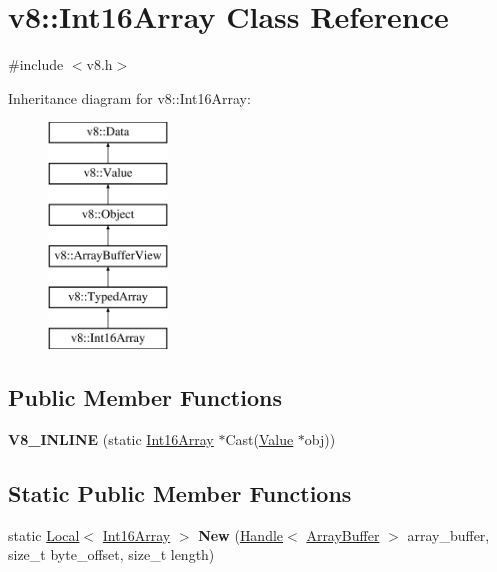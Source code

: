 \hypertarget{classv8_1_1_int16_array}{}\section{v8\+:\+:Int16\+Array Class Reference}
\label{classv8_1_1_int16_array}


{\ttfamily \#include $<$v8.\+h$>$}

Inheritance diagram for v8\+:\+:Int16\+Array\+:\begin{figure}[H]
\begin{center}
\leavevmode
\includegraphics[height=6.000000cm]{classv8_1_1_int16_array}
\end{center}
\end{figure}
\subsection*{Public Member Functions}
\begin{DoxyCompactItemize}
\item 
\hypertarget{classv8_1_1_int16_array_af68e47065b6e19f3757c5a023f2aa8f3}{}{\bfseries V8\+\_\+\+I\+N\+L\+I\+N\+E} (static \hyperlink{classv8_1_1_int16_array}{Int16\+Array} $\ast$Cast(\hyperlink{classv8_1_1_value}{Value} $\ast$obj))\label{classv8_1_1_int16_array_af68e47065b6e19f3757c5a023f2aa8f3}

\end{DoxyCompactItemize}
\subsection*{Static Public Member Functions}
\begin{DoxyCompactItemize}
\item 
\hypertarget{classv8_1_1_int16_array_adc49fddf7e0b2c719085f5f9af3762e5}{}static \hyperlink{classv8_1_1_local}{Local}$<$ \hyperlink{classv8_1_1_int16_array}{Int16\+Array} $>$ {\bfseries New} (\hyperlink{classv8_1_1_handle}{Handle}$<$ \hyperlink{classv8_1_1_array_buffer}{Array\+Buffer} $>$ array\+\_\+buffer, size\+\_\+t byte\+\_\+offset, size\+\_\+t length)\label{classv8_1_1_int16_array_adc49fddf7e0b2c719085f5f9af3762e5}

\end{DoxyCompactItemize}
